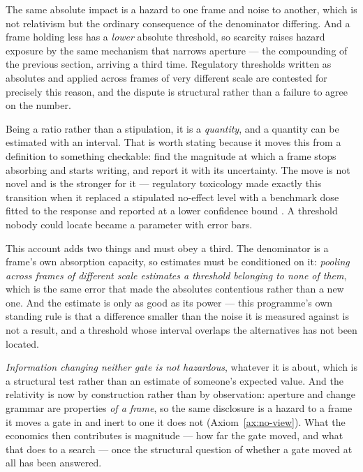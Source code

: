 \documentclass[11pt,a4paper]{article}
\theoremstyle{remark}\newtheorem{remark}[definition]{Remark}
\begin{document}
The same absolute impact is a hazard to one frame and noise to another,
which is not relativism but the ordinary consequence of the denominator differing. And a frame holding
less has a \emph{lower} absolute threshold, so scarcity raises hazard exposure by the same mechanism
that narrows aperture --- the compounding of the previous section, arriving a third time. Regulatory
thresholds written as absolutes and applied across frames of very different scale are contested for
precisely this reason, and the dispute is structural rather than a failure to agree on the number.

Being a ratio rather than a stipulation, it is a \emph{quantity}, and a quantity can be estimated with
an interval. That is worth stating because it moves this from a definition to something checkable: find
the magnitude at which a frame stops absorbing and starts writing, and report it with its uncertainty.
The move is not novel and is the stronger for it --- regulatory toxicology made exactly this transition
when it replaced a stipulated no-effect level with a benchmark dose fitted to the response and reported
at a lower confidence bound \citep{crump1984}. A threshold nobody could locate became a parameter with
error bars.

This account adds two things and must obey a third. The denominator is a frame's own absorption capacity, so estimates must be conditioned on it: \emph{pooling across frames of different scale
estimates a threshold belonging to none of them}, which is the same error that made the absolutes
contentious rather than a new one. And the estimate is only as good as its power --- this programme's
own standing rule is that a difference smaller than the noise it
is measured against is not a result, and a threshold whose interval overlaps the alternatives has not
been located.

\emph{Information changing neither gate is not
hazardous}, whatever it is about, which is a structural test rather than an estimate of someone's
expected value. And the relativity is now by construction rather than by observation: aperture and
change grammar are properties \emph{of a frame}, so the same disclosure is a hazard to a frame it moves
a gate in and inert to one it does not (Axiom~\ref{ax:no-view}). What the economics then contributes is
magnitude --- how far the gate moved, and what that does to a search --- once the structural question of
whether a gate moved at all has been answered.
\end{document}
